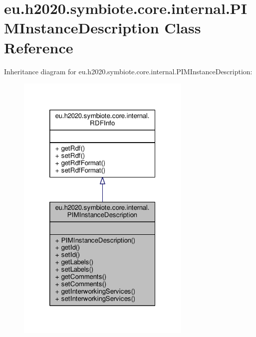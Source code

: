 \hypertarget{classeu_1_1h2020_1_1symbiote_1_1core_1_1internal_1_1PIMInstanceDescription}{}\section{eu.\+h2020.\+symbiote.\+core.\+internal.\+P\+I\+M\+Instance\+Description Class Reference}
\label{classeu_1_1h2020_1_1symbiote_1_1core_1_1internal_1_1PIMInstanceDescription}


Inheritance diagram for eu.\+h2020.\+symbiote.\+core.\+internal.\+P\+I\+M\+Instance\+Description\+:
\nopagebreak
\begin{figure}[H]
\begin{center}
\leavevmode
\includegraphics[width=236pt]{classeu_1_1h2020_1_1symbiote_1_1core_1_1internal_1_1PIMInstanceDescription__inherit__graph}
\end{center}
\end{figure}


